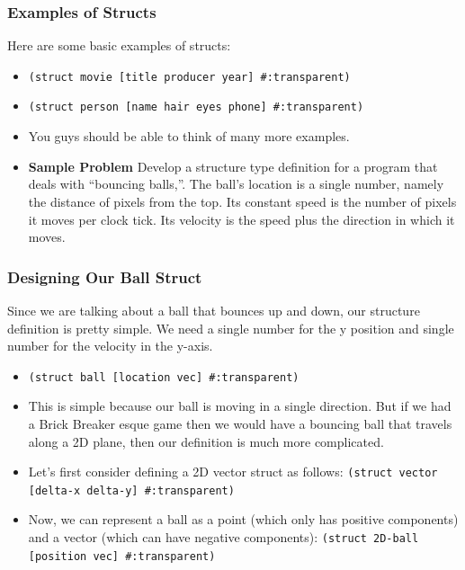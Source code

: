 \documentclass{beamer}
\begin{document}
\begin{frame}
  \frametitle{Examples of Structs}
  Here are some basic examples of structs:
  \begin{itemize}
  \item<2-> \texttt{(struct movie [title producer year] \#:transparent)}
  \item<3-> \texttt{(struct person [name hair eyes phone] \#:transparent)}
  \item<4-> You guys should be able to think of many more examples.
    \item<5-> \textbf{Sample Problem} Develop a structure type definition for a program that deals with “bouncing balls,”. The ball’s location is a single number, namely the distance of pixels from the top. Its constant speed is the number of pixels it moves per clock tick. Its velocity is the speed plus the direction in which it moves.
  \end{itemize}
  
  
\end{frame}

\begin{frame}
  \frametitle{Designing Our Ball Struct}
  Since we are talking about a ball that bounces up and down, our structure definition is pretty simple. We need a single number for the y position and single
  number for the velocity in the y-axis.
  \begin{itemize}
  \item<2-> \texttt{(struct ball [location vec] \#:transparent)}
  \item<3-> This is simple because our ball is moving in a single direction. But if we had a Brick Breaker esque game then we would have a bouncing ball that
    travels along a 2D plane, then our definition is much more complicated.
  \item<4-> Let's first consider defining a 2D vector struct as follows: \texttt{(struct vector [delta-x delta-y] \#:transparent)}
  \item<5-> Now, we can represent a ball as a point (which only has positive components) and a vector (which can have negative components):
    \texttt{(struct 2D-ball [position vec] \#:transparent)}
  \end{itemize}
\end{frame}

\end{document}
